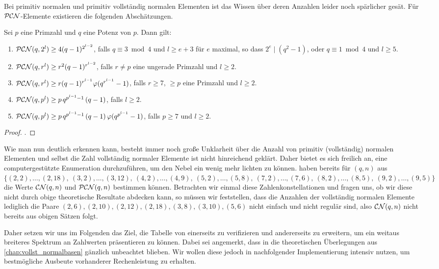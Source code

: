 Bei primitiv normalen und primitiv vollständig normalen Elementen
ist das Wissen über deren Anzahlen leider noch spärlicher gesät. 
Für $\mathcal{PCN}$-Elemente existieren die folgenden Abschätzungen.

\begin{satz}
  Sei $p$ eine Primzahl und $q$ eine Potenz von $p$. Dann gilt:
  \begin{enumerate}
    \item $\mathcal{PCN}(q,2^l) \geq 4(q-1)^{2^{l-2}}$, falls $q\equiv 3 \bmod 4$
      und $l\geq e+3$ für $e$ maximal, so dass $2^e\mid (q^2-1)$, oder
      $q\equiv 1\bmod 4$ und $l\geq 5$.
    \item $\mathcal{PCN}(q,r^l) \geq r^2(q-1)^{r^{l-2}}$, falls
      $r\neq p$ eine ungerade Primzahl und $l\geq 2$.
    \item $\mathcal{PCN}(q,r^l) \geq r(q-1)^{r^{l-1}}\varphi(q^{r^{l-1}}-1)$, falls
      $r\geq 7$, $\geq p$ eine Primzahl und $l\geq 2$.
    \item $\mathcal{PCN}(q,p^l) \geq p\,q^{p^{l-1}-1}\,(q-1)$, falls $l\geq 2$.
    \item $\mathcal{PCN}(q,p^l)\geq p\,q^{p^{l-1}-1}\,(q-1)\,\varphi(q^{p^{l-1}}-1)$,
      falls $p\geq 7$ und $l\geq 2$.
  \end{enumerate}
\end{satz}
\begin{proof}
  \autocite{hachenberger2010}.
\end{proof}

Wie man nun deutlich erkennen kann, besteht immer noch große Unklarheit über
die Anzahl von primitiv (vollständig) normalen Elementen und selbst die Zahl
vollständig normaler Elemente ist nicht hinreichend geklärt. Daher bietet es
sich freilich an, eine computergestützte Enumeration durchzuführen, um den
Nebel ein wenig mehr lichten zu können. 
\citeauthor{morgan1996} \autocite{morgan1996} haben bereits 
\citeyear{morgan1996} für $(q,n)$ aus 
$\{ (2,2),\ldots,(2,18),\allowbreak\ 
  (3,2),\ldots,(3,12),\allowbreak\ 
  (4,2),\ldots,(4,9),\allowbreak\ 
  (5,2),\ldots,(5,8),\allowbreak\ 
  (7,2),\ldots,(7,6),\allowbreak\ 
  (8,2),\ldots,(8,5),\allowbreak\ 
  (9,2),\ldots,(9,5)\}$ die Werte $\mathcal{CN}(q,n)$ und $\mathcal{PCN}(q,n)$ bestimmen können.
Betrachten wir einmal diese Zahlenkonstellationen und fragen uns, ob wir diese
nicht durch obige theoretische Resultate abdecken kann, so müssen wir
feststellen, dass die Anzahlen der vollständig normalen Elemente lediglich
die Paare $(2,6), (2,10),(2,12),(2,18), (3,8), (3,10), (5,6)$ nicht einfach und
nicht regulär sind, also $\mathcal{CN}(q,n)$ nicht bereits aus obigen Sätzen
folgt.

Daher setzen wir uns im Folgenden das Ziel, die Tabelle von 
\citeauthor{morgan1996} einerseits zu verifizieren und andererseits zu
erweitern, um ein weitaus breiteres Spektrum an Zahlwerten präsentieren zu
können. Dabei sei angemerkt, dass in \autocite{morgan1996} die theoretischen
Überlegungen aus \autoref{chap:vollst_normalbasen} gänzlich unbeachtet blieben.
Wir wollen diese jedoch in nachfolgender Implementierung intensiv nutzen, um
bestmögliche Ausbeute vorhanderer Rechenleistung zu erhalten.
